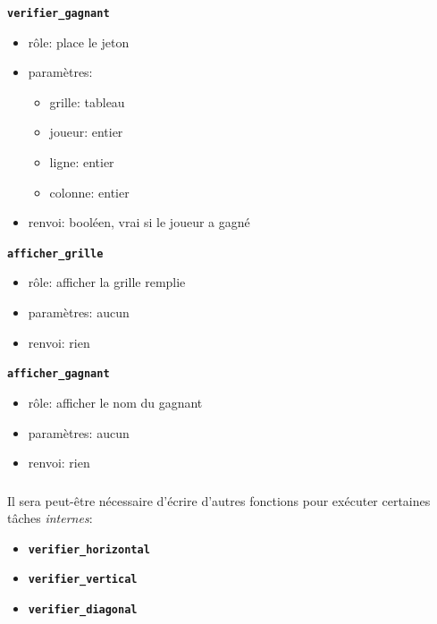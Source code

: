 \documentclass[svgnames,11pt]{beamer}
\begin{document}
\begin{frame}

    {\Large \textbf{\texttt{verifier\_gagnant}}}
    \begin{itemize}
        \item rôle: place le jeton 
        \item paramètres:
        \begin{itemize}
            \item grille: tableau
            \item joueur: entier
            \item ligne: entier
            \item colonne: entier
        \end{itemize}
        \item renvoi: booléen, vrai si le joueur a gagné
    \end{itemize}

\end{frame}
\begin{frame}

    {\Large \textbf{\texttt{afficher\_grille}}}
    \begin{itemize}
        \item rôle: afficher la grille remplie
        \item paramètres: aucun
        \item renvoi: rien
    \end{itemize}

\end{frame}
\begin{frame}

    {\Large \textbf{\texttt{afficher\_gagnant}}}
    \begin{itemize}
        \item rôle: afficher le nom du gagnant 
        \item paramètres: aucun
        \item renvoi: rien
    \end{itemize}

\end{frame}
\begin{frame}
    \frametitle{}

\begin{aretenir}[Observation]
Il sera peut-être nécessaire d'écrire d'autres fonctions pour exécuter certaines tâches \emph{internes}:
\begin{itemize}
    \item \textbf{\texttt{verifier\_horizontal}}
    \item \textbf{\texttt{verifier\_vertical}}
    \item \textbf{\texttt{verifier\_diagonal}}
\end{itemize}
\end{aretenir}
\end{frame}
\end{document}
